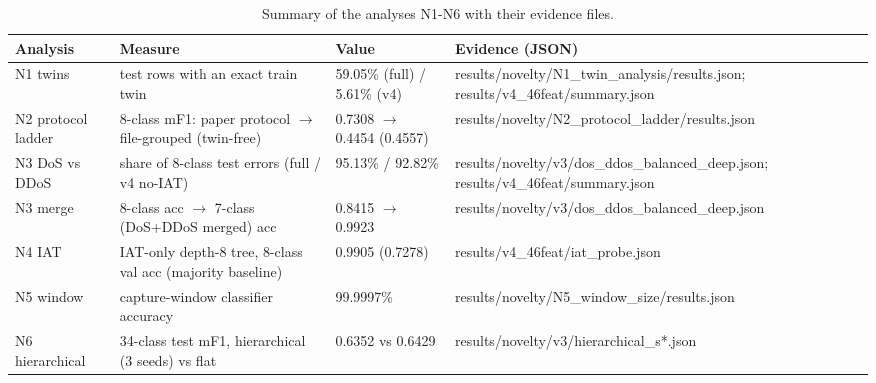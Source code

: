 \begin{table}[!t]
\centering
\caption{Summary of the analyses N1-N6 with their evidence files.}\label{tab:novelty}
\scriptsize
\setlength{\tabcolsep}{3pt}
\begin{tabular}{lp{4.2cm}p{3.2cm}p{5.4cm}}
\toprule
\textbf{Analysis} & \textbf{Measure} & \textbf{Value} & \textbf{Evidence (JSON)} \\
\midrule
N1 twins & test rows with an exact train twin & 59.05\% (full) / 5.61\% (v4) & results/novelty/N1\_twin\_analysis/results.json; results/v4\_46feat/summary.json \\
N2 protocol ladder & 8-class mF1: paper protocol $\rightarrow$ file-grouped (twin-free) & 0.7308 $\rightarrow$ 0.4454 (0.4557) & results/novelty/N2\_protocol\_ladder/results.json \\
N3 DoS vs DDoS & share of 8-class test errors (full / v4 no-IAT) & 95.13\% / 92.82\% & results/novelty/v3/dos\_ddos\_balanced\_deep.json; results/v4\_46feat/summary.json \\
N3 merge & 8-class acc $\rightarrow$ 7-class (DoS+DDoS merged) acc & 0.8415 $\rightarrow$ 0.9923 & results/novelty/v3/dos\_ddos\_balanced\_deep.json \\
N4 IAT & IAT-only depth-8 tree, 8-class val acc (majority baseline) & 0.9905 (0.7278) & results/v4\_46feat/iat\_probe.json \\
N5 window & capture-window classifier accuracy & 99.9997\% & results/novelty/N5\_window\_size/results.json \\
N6 hierarchical & 34-class test mF1, hierarchical (3 seeds) vs flat & 0.6352 vs 0.6429 & results/novelty/v3/hierarchical\_s*.json \\
\bottomrule
\end{tabular}
\end{table}
